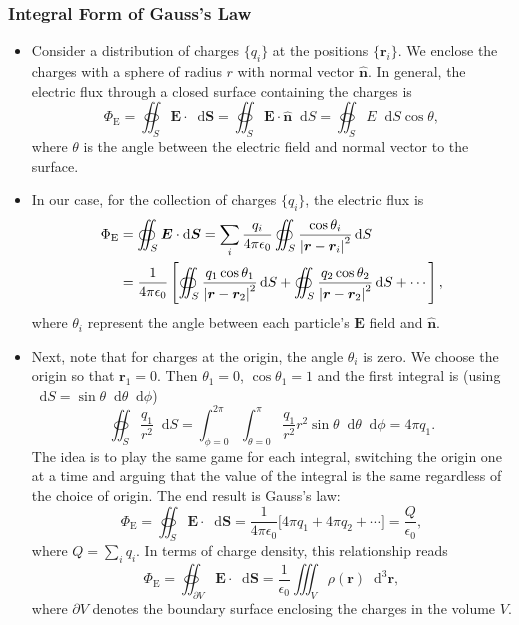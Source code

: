 \documentclass[11pt, a4paper]{article}
\newcommand{\diff}{\mathop{}\!\mathrm{d}} %
\newcommand{\dr}{\diff^{3} \r}  %
\renewcommand{\vec}[1]{\bm{#1}} %
\newcommand{\uvec}[1]{\hat{\vec{#1}}} %
\renewcommand{\r}{\vec{r}}
\newcommand{\E}{\vec{E}} %
\renewcommand{\S}{\mathbf{S}}  %
\newcommand{\ee}{\epsilon_{0}}  %
\begin{document}
\subsubsection{Integral Form of Gauss's Law}
\begin{itemize}
	\item Consider a distribution of charges $ \{q_{i}\} $ at the positions $ \{\r_{i}\} $. We enclose the charges with a sphere of radius $ r $ with normal vector $ \uvec{n} $. In general, the electric flux through a closed surface containing the charges is
	\begin{equation*}
		\Phi_{\text{E}} = \oiint_{S} \E \cdot \diff \vec{S} = \oiint_{S} \E \cdot \uvec{n} \diff S = \oiint_{S} E \diff S \cos \theta,
	\end{equation*}
	where $ \theta $ is the angle between the electric field and normal vector to the surface.
	
	\item In our case, for the collection of charges $ \{q_{i}\} $, the electric flux is
	\begin{align*}
		\Phi_{\text{E}} &= \oiint_{S} \E \cdot \diff \vec{S} = \sum_{i} \frac{q_{i}}{4\pi \ee} \oiint_{S} \frac{\cos \theta_{i}}{\abs{\r - \r_{i}}^{2}} \diff S \\
		& = \frac{1}{4\pi \ee} \left[ \oiint_{S} \frac{ q_{1} \cos \theta_{1}}{\abs{\r - \r_{2}}^{2}} \diff S + \oiint_{S} \frac{ q_{2} \cos \theta_{2}}{\abs{\r - \r_{2}}^{2}} \diff S  + \cdots \right],
	\end{align*}
	where $ \theta_{i} $ represent the angle between each particle's $ \E $ field and $ \uvec{n} $. 
	
	\item Next, note that for charges at the origin, the angle $ \theta_{i} $  is zero. We choose the origin so that $ \r_{1} = 0 $. Then $ \theta_{1} = 0 $, $ \cos \theta_{1} = 1 $ and the first integral is (using $ \diff S = \sin \theta \diff \theta \diff \phi $)
	\begin{equation*}
		\oiint_{S} \frac{q_{1}}{r^{2}} \diff S = \int_{\phi = 0}^{2\pi} \int_{\theta = 0}^{\pi} \frac{q_{1}}{r^{2}}r^{2} \sin \theta \diff \theta \diff \phi = 4\pi q_{1}.
	\end{equation*}
	The idea is to play the same game for each integral, switching the origin one at a time and arguing that the value of the integral is the same regardless of the choice of origin. The end result is Gauss's law:
	\begin{equation*}
		\Phi_{\text{E}} = \oiint_{S} \E \cdot \diff \S = \frac{1}{4\pi \ee} \big[4\pi q_{1} + 4\pi q_{2} + \cdots \big] = \frac{Q}{\ee},
	\end{equation*}
	where $ Q = \sum_{i} q_{i} $. In terms of charge density, this relationship reads
	\begin{equation*}
		\Phi_{\text{E}} = \oiint_{\partial V} \E \cdot \diff \vec{S} = \frac{1}{\ee}\iiint_{V} \rho(\r) \dr,
	\end{equation*}
	where $ \partial V $ denotes the boundary surface enclosing the charges in the volume $ V $.
	

\end{itemize}
\end{document}
